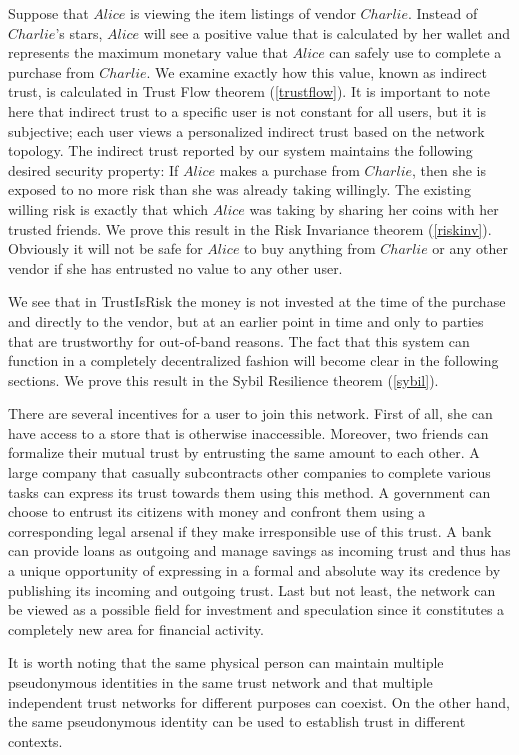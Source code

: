    Suppose that $Alice$ is viewing the item listings of vendor $Charlie$. Instead of $Charlie$'s stars, $Alice$ will see a
   positive value that is calculated by her wallet and represents the maximum monetary value that $Alice$ can safely use to
   complete a purchase from $Charlie$. We examine exactly how this value, known as indirect trust, is calculated in Trust
   Flow theorem (\ref{trustflow}). It is important to note here that indirect trust to a specific user is not constant for
   all users, but it is subjective; each user views a personalized indirect trust based on the network topology. The indirect
   trust reported by our system maintains the following desired security property: If $Alice$ makes a purchase from
   $Charlie$, then she is exposed to no more risk than she was already taking willingly. The existing willing risk is exactly
   that which $Alice$ was taking by sharing her coins with her trusted friends. We prove this result in the Risk Invariance
   theorem (\ref{riskinv}). Obviously it will not be safe for $Alice$ to buy anything from $Charlie$ or any other vendor if
   she has entrusted no value to any other user.

   We see that in TrustIsRisk the money is not invested at the time of the purchase and directly to the vendor, but at an
   earlier point in time and only to parties that are trustworthy for out-of-band reasons. The fact that this system can
   function in a completely decentralized fashion will become clear in the following sections. We prove this result in the
   Sybil Resilience theorem (\ref{sybil}).

   There are several incentives for a user to join this network. First of all, she can have access to a store that is
   otherwise inaccessible. Moreover, two friends can formalize their mutual trust by entrusting the same amount to each
   other. A large company that casually subcontracts other companies to complete various tasks can express its trust
   towards them using this method. A government can choose to entrust its citizens with money and confront them using a
   corresponding legal arsenal if they make irresponsible use of this trust. A bank can provide loans as outgoing and
   manage savings as incoming trust and thus has a unique opportunity of expressing in a formal and absolute way its
   credence by publishing its incoming and outgoing trust. Last but not least, the network can be viewed as a possible
   field for investment and speculation since it constitutes a completely new area for financial activity.

   It is worth noting that the same physical person can maintain multiple pseudonymous identities in the same trust network
   and that multiple independent trust networks for different purposes can coexist. On the other hand, the same
   pseudonymous identity can be used to establish trust in different contexts.
